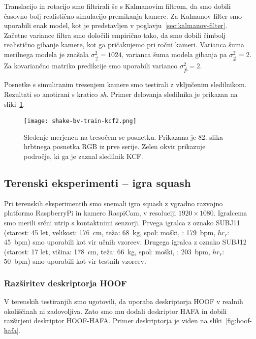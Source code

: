 Translacijo in rotacijo smo filtrirali še s Kalmanovim filtrom, da smo dobili časovno bolj realistično simulacijo premikanja kamere. Za Kalmanov filter smo uporabili enak model, kot je predstavljen v poglavju~\ref{sec:kalmanov-filter}. Začetne variance filtra smo določili empirično tako, da smo dobili čimbolj realistično gibanje kamere, kot ga pričakujemo pri ročni kameri. Varianca šuma merilnega modela je znašala $\sigma_\vec{z}^2=1024$, varianca šuma modela gibanja pa $\sigma_\vec{x}^2=2$. Za kovariančno matriko predikcije smo uporabili varianco $\sigma_\vec{P}^2=2$.

Posnetke s simuliranim tresenjem kamere smo testirali z vključenim sledilnikom. Rezultati so anotirani s kratico \textit{sh}. Primer delovanja sledilnika je prikazan na sliki~\ref{fig:vibracije}.

\begin{figure}[!htb]
	\centering
	\texttt{[image: shake-bv-train-kcf2.png]}
	\caption[Sledenje merjencu na tresočem se posnetku]{Sledenje merjencu na tresočem  se posnetku. Prikazana je 82. slika hrbtnega posnetka RGB iz prve serije. Zelen okvir prikazuje področje, ki ga je zaznal sledilnik KCF.}
	\label{fig:vibracije}
\end{figure} 








\subsection{Terenski eksperimenti -- igra squash}
Pri terenskih eksperimentih smo snemali igro squash z vgradno razvojno platformo RaspberryPi in kamero RaspiCam, v resoluciji  $1920 \times 1080$. Igralcema smo merili srčni utrip s kontaktnimi senzorji. Prvega igralca z oznako SUBJ11  (starost: 45 let, velikost: \SI{176}{\cm}, teža: \SI{68}{\kg}, spol: moški, \hrtmax: \SI{179}{bpm}, $hr_{r}$: \SI{45}{bpm}) smo uporabili kot vir učnih vzorcev. Drugega igralca z oznako SUBJ12 (starost: 17 let, višina: \SI{178}{\cm}, teža: \SI{66}{\kg}, spol: moški, \hrtmax: \SI{203}{bpm}, $hr_{r}$: \SI{50}{bpm}) smo uporabili kot vir testnih vzorcev.

\subsubsection{Razširitev deskriptorja HOOF}
V terenskih testiranjih smo ugotovili, da uporaba deskriptorja HOOF v realnih okoliščinah ni zadovoljiva. Zato smo mu dodali deskriptor HAFA in dobili razširjeni deskriptor HOOF-HAFA. Primer deskriptorja je viden na sliki~\ref{fig:hoof-hafa}.

